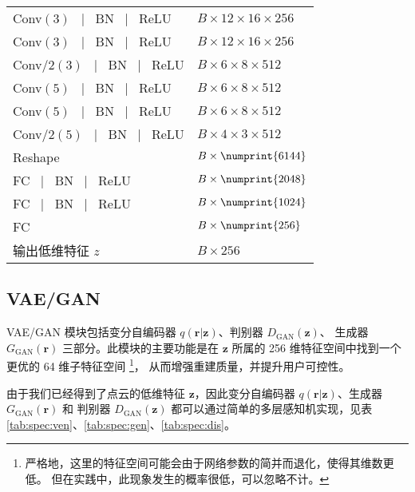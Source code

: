 \begin{longtable}[c]{C{8cm}C{4cm}}
	Conv$(3)$ \, | \, BN \, | \, ReLU     & $B \times 12 \times 16 \times 256$                 \\
	Conv$(3)$ \, | \, BN \, | \, ReLU     & $B \times 12 \times 16 \times 256$                 \\
	Conv/2$(3)$ \, | \, BN \, | \, ReLU   & $B \times 6 \times 8 \times 512$                   \\[5pt]

	Conv$(5)$ \, | \, BN \, | \, ReLU     & $B \times 6 \times 8 \times 512$                   \\
	Conv$(5)$ \, | \, BN \, | \, ReLU     & $B \times 6 \times 8 \times 512$                   \\
	Conv/2$(5)$ \, | \, BN \, | \, ReLU   & $B \times 4 \times 3 \times 512$                   \\[5pt]

	Reshape                               & $B \times \numprint{6144}$                         \\
	FC \, | \, BN \, | \, ReLU            & $B \times \numprint{2048}$                         \\
	FC \, | \, BN \, | \, ReLU            & $B \times \numprint{1024}$                         \\
	FC                                    & $B \times \numprint{256}$                          \\
	\hdashline
	输出低维特征 $z$                      & $B \times 256$                                     \\
	\bottomrule[1.5pt]
\end{longtable}

\subsection{VAE/GAN}
VAE/GAN 模块包括变分自编码器 $q(\bm r | \bm z)$、判别器 $D_{\text{GAN}}(\bm z)$、
生成器 $G_{\text{GAN}}(\bm r)$ 三部分。此模块的主要功能是在 $\bm z$ 所属的 256 维特征空间中找到一个更优的
64 维子特征空间
\footnote{严格地，这里的特征空间可能会由于网络参数的简并而退化，使得其维数更低。
	但在实践中，此现象发生的概率很低，可以忽略不计。}，
从而增强重建质量，并提升用户可控性。

由于我们已经得到了点云的低维特征 $\bm z$，因此变分自编码器 $q(\bm r | \bm z)$、生成器 $G_{\text{GAN}}(\bm r)$ 和 判别器 $D_{\text{GAN}}(\bm z)$ 都可以通过简单的多层感知机实现，见表 \ref{tab:spec:ven}、\ref{tab:spec:gen}、\ref{tab:spec:dis}。

